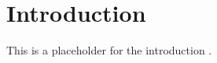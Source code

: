 

\chapter{Introduction}
\label{cha:introduction}


This is a placeholder for the introduction \cite{ehs_calc}.


